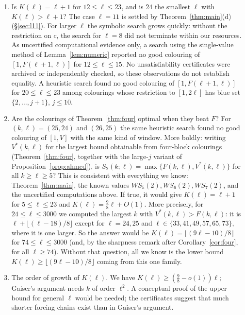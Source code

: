 \documentclass[11pt]{amsart}
\theoremstyle{definition}
\newcommand{\F}{F}
\newcommand{\Stwo}{S_2}
\begin{document}
\begin{enumerate}[label=\arabic*.]
\item Is $K(\ell)=\ell+1$ for $12\le\ell\le23$, and is $24$ the smallest $\ell$ with $K(\ell)>\ell+1$? The case $\ell=11$ is settled by Theorem~\ref{thm:main}(d) (\S\ref{sec:l11}). For larger $\ell$ the symbolic search grows quickly: without the restriction on $c$, the search for $\ell=8$ did not terminate within our resources. As uncertified computational evidence only, a search using the single-value method of Lemma~\ref{lem:numeric} reported no good colouring of $[1,\F(\ell+1,\ell)]$ for $12\le\ell\le15$. No unsatisfiability certificates were archived or independently checked, so these observations do not establish equality. A heuristic search found no good colouring of $[1,\F(\ell+1,\ell)]$ for $20\le\ell\le23$ among colourings whose restriction to $[1,2\ell]$ has blue set $\{2,\dots,j+1\}$, $j\le10$.
\item Are the colourings of Theorem~\ref{thm:four} optimal when they beat $\F$? For $(k,\ell)=(25,24)$ and $(26,25)$ the same heuristic search found no good colouring of $[1,V]$ with the same kind of window. More boldly: writing $V^*(k,\ell)$ for the largest bound obtainable from four-block colourings (Theorem~\ref{thm:four}, together with the large-$j$ variant of Proposition~\ref{prop:ahmed}), is $\Stwo(k;\ell)=\max\{\F(k,\ell),V^*(k,\ell)\}$ for all $k\ge\ell\ge5$? This is consistent with everything we know: Theorem~\ref{thm:main}, the known values $WS_5(2),WS_6(2),WS_7(2)$, and the uncertified computations above. If true, it would give $K(\ell)=\ell+1$ for $5\le\ell\le23$ and $K(\ell)=\tfrac98\ell+O(1)$. More precisely, for $24\le\ell\le3000$ we computed the largest $k$ with $V^*(k,\ell)>\F(k,\ell)$: it is $\ell+\lfloor(\ell-18)/8\rfloor$ except for $\ell=24,25$ and $\ell\in\{33,41,49,57,65,73\}$, where it is one larger. So the answer would be $K(\ell)=\lfloor(9\ell-10)/8\rfloor$ for $74\le\ell\le3000$ (and, by the sharpness remark after Corollary~\ref{cor:four}, for all $\ell\ge74$). Without that question, all we know is the lower bound $K(\ell)\ge\lfloor(9\ell-10)/8\rfloor$ coming from this one family.
\item The order of growth of $K(\ell)$. We have $K(\ell)\ge(\tfrac98-o(1))\ell$; Gaiser's argument needs $k$ of order $\ell^2$. A conceptual proof of the upper bound for general $\ell$ would be needed; the certificates suggest that much shorter forcing chains exist than in Gaiser's argument.

\end{enumerate}
\end{document}
